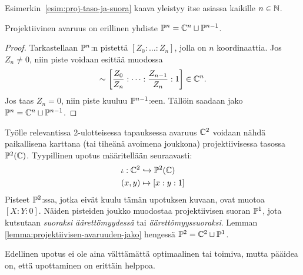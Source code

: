 Esimerkin~\ref{esim:proj-taso-ja-suora} kaava yleistyy itse asiassa kaikille $n\in\N$.
\begin{lemma}
    \label{lemma:projektiivisen-avaruuden-jako}
    Projektiivinen avaruus on erillinen yhdiste $\P^{n}=\C^n\sqcup\P^{n-1}$.
\end{lemma}
\begin{proof}
    Tarkastellaan $\P^{n}$:n pistettä $[Z_0:\dots:Z_{n}]$, jolla on $n$ koordinaattia. Jos $Z_{n}\neq 0$, niin piste voidaan esittää muodossa
    \begin{equation*}
        [Z_0:\dots:Z_n] \sim \left[\frac{Z_0}{Z_n}:\dots:\frac{Z_{n-1}}{Z_n}:1\right] \in \C^n.
    \end{equation*}
    Jos taas $Z_n=0$, niin piste kuuluu $\P^{n-1}$:een. Tällöin saadaan jako $\P^{n}=\C^n\sqcup\P^{n-1}$.
\end{proof}
Työlle relevantissa 2-ulotteisessa tapauksessa avaruus $\C^2$ voidaan nähdä paikallisena karttana (tai tiheänä avoimena joukkona) projektiivisessa tasossa $\P^2(\C)$. Tyypillinen upotus määritellään seuraavasti:
\begin{align*}
    \iota : \C^2 &\hookrightarrow \P^2(\C) \\
    (x,y) &\mapsto [x : y : 1]
\end{align*}
Pisteet $\P^2$:ssa, jotka eivät kuulu tämän upotuksen kuvaan, ovat muotoa $[X:Y:0]$. Näiden pisteiden joukko muodostaa projektiivisen suoran $\P^1$, jota kutsutaan \emph{suoraksi äärettömyydessä} tai \emph{äärettömyyssuoraksi}. Lemman \ref{lemma:projektiivisen-avaruuden-jako} hengessä $\P^2=\C^2\sqcup\P^1$.

Edellinen upotus ei ole aina välttämättä optimaalinen tai toimiva, mutta pääidea on, että upottaminen on erittäin helppoa.

